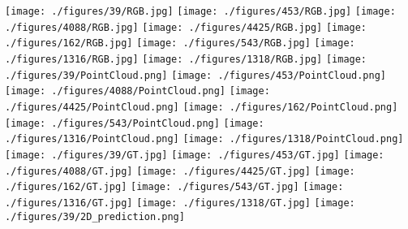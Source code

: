 \documentclass[letterpaper, 10 pt, conference]{ieeeconf}
\begin{document}
\newcommand{\sizeOfimage}{0.11}

\begin{figure*}[thpb]
\centering
  \label{fig:RGB39}{\texttt{[image: ./figures/39/RGB.jpg]}}
  \label{fig:RGB453}{\texttt{[image: ./figures/453/RGB.jpg]}}
  \label{fig:RGB4088}{\texttt{[image: ./figures/4088/RGB.jpg]}}
  \label{fig:RGB4425}{\texttt{[image: ./figures/4425/RGB.jpg]}} 
  \label{fig:RGB162}{\texttt{[image: ./figures/162/RGB.jpg]}} 
  \label{fig:RGB543}{\texttt{[image: ./figures/543/RGB.jpg]}} 
  \label{fig:RGB1316}{\texttt{[image: ./figures/1316/RGB.jpg]}} 
  \label{fig:RGB1318}{\texttt{[image: ./figures/1318/RGB.jpg]}} 
  \label{fig:PointCloud39}{\texttt{[image: ./figures/39/PointCloud.png]}} 
  \label{fig:PointCloud453}{\texttt{[image: ./figures/453/PointCloud.png]}} 
  \label{fig:PointCloud4088}{\texttt{[image: ./figures/4088/PointCloud.png]}} 
  \label{fig:PointCloud4425}{\texttt{[image: ./figures/4425/PointCloud.png]}} 
  \label{fig:PointCloud162}{\texttt{[image: ./figures/162/PointCloud.png]}} 
  \label{fig:PointCloud543}{\texttt{[image: ./figures/543/PointCloud.png]}} 
  \label{fig:PointCloud1316}{\texttt{[image: ./figures/1316/PointCloud.png]}} 
  \label{fig:PointCloud1318}{\texttt{[image: ./figures/1318/PointCloud.png]}} 
  \label{fig:GT39}{\texttt{[image: ./figures/39/GT.jpg]}} 
  \label{fig:GT453}{\texttt{[image: ./figures/453/GT.jpg]}} 
  \label{fig:GT4088}{\texttt{[image: ./figures/4088/GT.jpg]}} 
  \label{fig:GT4425}{\texttt{[image: ./figures/4425/GT.jpg]}} 
  \label{fig:GT162}{\texttt{[image: ./figures/162/GT.jpg]}} 
  \label{fig:GT543}{\texttt{[image: ./figures/543/GT.jpg]}} 
  \label{fig:GT1316}{\texttt{[image: ./figures/1316/GT.jpg]}} 
  \label{fig:GT1318}{\texttt{[image: ./figures/1318/GT.jpg]}} 
  \label{fig:2D_prediction39}{\texttt{[image: ./figures/39/2D\_prediction.png]}} 

\end{figure*}
\end{document}
